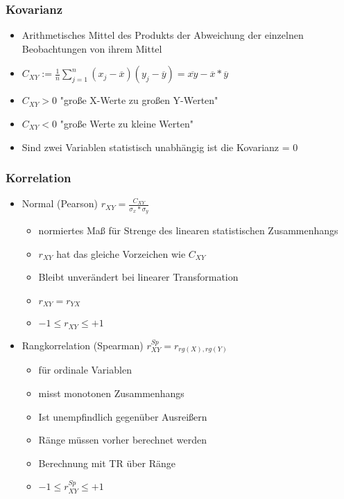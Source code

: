 \documentclass[a4paper]{article}
\begin{document}
\begin{landscape}
\begin{multicols}{4}
    \subsubsection*{Kovarianz}
    \begin{itemize}[noitemsep,nolistsep,leftmargin=*]
        \item Arithmetisches Mittel des Produkts der Abweichung der einzelnen Beobachtungen von ihrem Mittel
        \item $C_{XY} := \frac{1}{n}\sum_{j = 1}^{n}{(x_j - \overline{x})(y_j - \overline{y})} = \overline{xy} - \overline{x}*\overline{y}$ 
        \item  $C_{XY} > 0$ "große X-Werte zu großen Y-Werten"
        \item $C_{XY} < 0$ "große Werte zu kleine Werten"
        \item Sind zwei Variablen statistisch unabhängig ist die Kovarianz = 0
    \end{itemize}

    \subsubsection*{Korrelation}
    \begin{itemize}[noitemsep,nolistsep,leftmargin=*]
        \item Normal (Pearson) $r_{XY} = \frac{C_{XY}}{\sigma_x * \sigma_y}$
        \begin{itemize}[noitemsep,nolistsep,leftmargin=*]
            \item normiertes Maß für Strenge des linearen statistischen Zusammenhangs
            \item $r_{XY}$ hat das gleiche Vorzeichen wie $C_{XY}$
            \item Bleibt unverändert bei linearer Transformation
            \item $r_{XY} = r_{YX}$
            \item $-1 \leq r_{XY} \leq +1$
        \end{itemize}
        \item Rangkorrelation (Spearman) $r_{XY}^{Sp} = r_{rg(X), rg(Y)}$
        \begin{itemize}[noitemsep,nolistsep,leftmargin=*]
            \item für ordinale Variablen
            \item misst monotonen Zusammenhangs
            \item Ist unempfindlich gegenüber Ausreißern
            \item Ränge müssen vorher berechnet werden
            \item Berechnung mit TR über Ränge
            \item $-1 \leq r_{XY}^{Sp} \leq +1$


\end{itemize}
\end{itemize}
\end{multicols}
\end{landscape}
\end{document}
